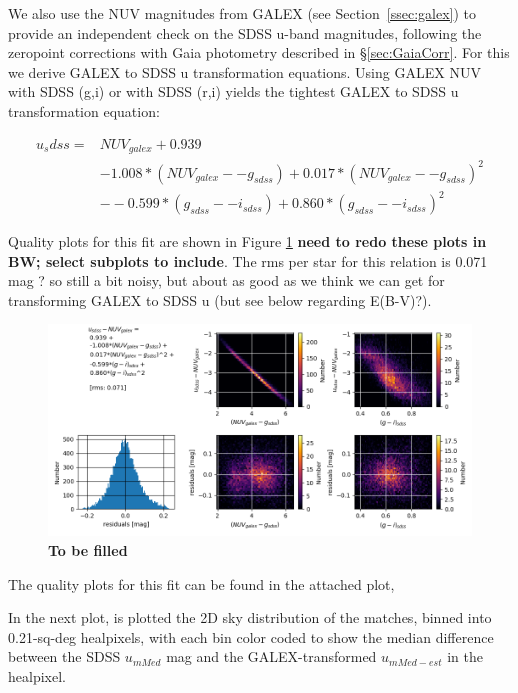 We also use the NUV magnitudes from GALEX (see Section~\ref{ssec:galex}) to provide an independent check on the SDSS u-band magnitudes, following the zeropoint corrections with Gaia photometry described in \S \ref{sec:GaiaCorr}. For this we derive 
GALEX to SDSS u transformation equations. Using GALEX NUV with SDSS (g,i) or with SDSS (r,i) yields the tightest GALEX to SDSS u transformation equation:
 
 \begin{equation}
 \begin{split}
  u_sdss = & NUV_{galex} + 0.939 \\
                  & - 1.008*(NUV_{galex} -- g_{sdss}) + 0.017*(NUV_{galex} -- g_{sdss})^2 \\
                  & -- 0.599*(g_{sdss} -- i_{sdss}) + 0.860*(g_{sdss} -- i_{sdss})^2
 \end{split}
\end{equation}
 
Quality plots for this fit are shown in Figure \ref{fig:GalexQA} {\bf need to redo these plots in BW; select subplots to include}. The rms per star for this relation is 0.071 mag ? so still a bit noisy, but about as good as we think we can get for transforming GALEX to SDSS u (but see below regarding E(B-V)?).
 
 \begin{figure}[th!]
    \centering\includegraphics[width=14cm]{figures/Galex_QA.png}
\caption{{\bf  To be filled}} 
\label{fig:GalexQA}
\end{figure}
    
The quality plots for this fit can be found in the attached plot,
 
In the next plot,
is plotted the 2D sky distribution of the matches, binned into 0.21-sq-deg healpixels, with each bin color coded to show the median difference between the SDSS $u_{mMed}$ mag and the GALEX-transformed $u_{mMed-est}$ in the healpixel.
 
